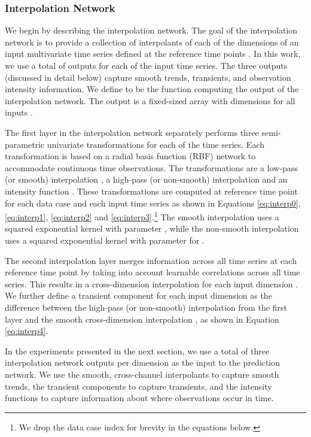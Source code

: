 \documentclass{article} \usepackage{iclr2019_conference,times}
\begin{document}
\subsubsection{Interpolation Network} We begin by describing the interpolation network. 
The goal of the interpolation network is to provide a collection of interpolants 
of each of the  dimensions of an input multivariate time series defined at the 
 reference time points . In this work, we use a total
of  outputs for each of the 
 input time series. The three outputs (discussed in detail below) capture smooth trends, transients, and observation intensity information. We define  to be the function computing the output  of the interpolation network. The output  is a fixed-sized array with dimensions  for all inputs .

The first layer in the interpolation network separately performs three semi-parametric 
univariate transformations for each of the  time series. Each transformation
is based on a radial basis function (RBF) network to accommodate continuous time observations. The transformations are
a low-pass (or smooth) interpolation , a high-pass (or non-smooth) interpolation  and an intensity function . These transformations are computed at reference time point  for each data case and each input time series  as shown in Equations \ref{eq:interp0}, \ref{eq:interp1}, \ref{eq:interp2} and \ref{eq:interp3}.\footnote{We drop the data case index  for brevity in the equations below.} The smooth interpolation  uses a squared exponential kernel with  parameter , while the non-smooth interpolation  uses a squared exponential kernel with parameter
 for . 

\vspace{-1mm}


The second interpolation layer merges information across all 
time series at each reference time point by taking into account
learnable correlations  across all time series. This
results in a cross-dimension interpolation  for 
each input dimension . We further define a transient component  
 for each input dimension  as the difference between
the high-pass (or non-smooth) interpolation   from the first layer and the
smooth cross-dimension interpolation  , as shown in Equation \ref{eq:interp4}. 

\vspace{-1mm}


In the experiments presented in the next section, we use a total of three
interpolation network outputs per dimension  as the input to the prediction network.
We use the smooth, cross-channel interpolants  to capture
smooth trends, the transient components  to capture transients, and the 
intensity functions  to capture information about where observations occur in time. 
\end{document}
